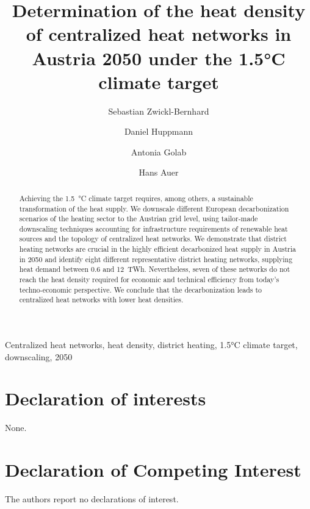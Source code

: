 \documentclass[review]{elsarticle}
\begin{document}
\begin{frontmatter}

\title{Determination of the heat density of centralized heat networks in Austria 2050 under the 1.5°C climate target}
\author[1,2]{Sebastian Zwickl-Bernhard}
\author[2]{Daniel Huppmann}
\author[1]{Antonia Golab}
\author[1]{Hans Auer}
\address[1]{Energy Economics Group (EEG), Technische Universität Wien, Gusshausstrasse 25-29/E370-3, 1040 Wien, Austria}
\address[2]{Energy, Climate and Environment (ECE) Program,  International Institute for Applied Systems Analysis (IIASA), Laxenburg, Austria}

\begin{abstract}
	Achieving the \SI{1.5}{\degreeCelsius} climate target requires, among others, a sustainable transformation of the heat supply. We downscale different European decarbonization scenarios of the heating sector to the Austrian grid level, using tailor-made downscaling techniques accounting for infrastructure requirements of renewable heat sources and the topology of centralized heat networks. We demonstrate that district heating networks are crucial in the highly efficient decarbonized heat supply in Austria in 2050 and identify eight different representative district heating networks, supplying heat demand between \SI{0.6}{} and \SI{12}{TWh}. Nevertheless, seven of these networks do not reach the heat density required for economic and technical efficiency from today's techno-economic perspective. We conclude that the decarbonization leads to centralized heat networks with lower heat densities. 
\end{abstract}

\begin{keyword}
	Centralized heat networks, heat density, district heating, 1.5°C climate target, downscaling, 2050
\end{keyword}
\end{frontmatter}

\newpage

\newpage







\section*{Declaration of interests}
None.
\section*{Declaration of Competing Interest}
The authors report no declarations of interest.
\end{document}

